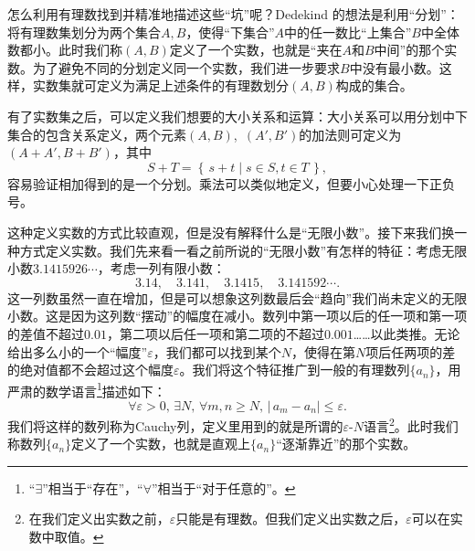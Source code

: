 \begin{center}
\end{center}


怎么利用有理数找到并精准地描述这些“坑”呢？Dedekind 的想法是利用“分划”：将有理数集划分为两个集合$A,B$，使得“下集合”$A$中的任一数比“上集合”$B$中全体数都小。此时我们称$(A,B)$定义了一个实数，也就是“夹在$A$和$B$中间”的那个实数。为了避免不同的分划定义同一个实数，我们进一步要求$B$中没有最小数。这样，实数集就可定义为满足上述条件的有理数划分$(A,B)$构成的集合。

有了实数集之后，可以定义我们想要的大小关系和运算：大小关系可以用分划中下集合的包含关系定义，两个元素$(A,B)$,~$(A',B')$的加法则可定义为$(A+A',B+B')$，其中
\[S+T=\left\{ \,s+t\mid s\in S,t\in T\, \right\} ,\]
容易验证相加得到的是一个分划。乘法可以类似地定义，但要小心处理一下正负号。

这种定义实数的方式比较直观，但是没有解释什么是“无限小数”。接下来我们换一种方式定义实数。我们先来看一看之前所说的“无限小数”有怎样的特征：考虑无限小数$3.1415926\cdots$，考虑一列有限小数：
\[3.14,\quad3.141,\quad3.1415,\quad3.141592\cdots.\]
这一列数虽然一直在增加，但是可以想象这列数最后会“趋向”我们尚未定义的无限小数。这是因为这列数“摆动”的幅度在减小。数列中第一项以后的任一项和第一项的差值不超过$0.01$，第二项以后任一项和第二项的不超过$0.001$……以此类推。无论给出多么小的一个“幅度”$\varepsilon$，我们都可以找到某个$N$，使得在第$N$项后任两项的差的绝对值都不会超过这个幅度$\varepsilon$。我们将这个特征推广到一般的有理数列$\{a_n\}$，用严肃的数学语言\footnote{“$\exists$”相当于“存在”，“$\forall$”相当于“对于任意的”。}描述如下：
\[\forall \varepsilon>0,\,\exists N,\,\forall  m,n\geqslant  N,\,|\,a_m-a_n|\leqslant  \varepsilon.\]
我们将这样的数列称为Cauchy列，定义里用到的就是所谓的$\varepsilon$-$N$语言\footnote{在我们定义出实数之前，$\varepsilon$只能是有理数。但我们定义出实数之后，$\varepsilon$可以在实数中取值。}。此时我们称数列$\{a_n\}$定义了一个实数，也就是直观上$\{a_n\}$“逐渐靠近”的那个实数。

